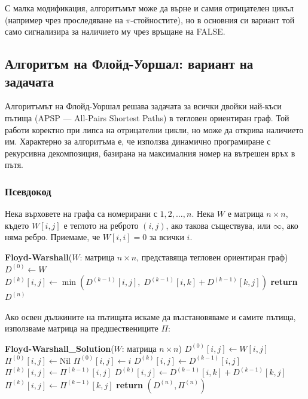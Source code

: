 \documentclass{article}
\renewcommand{\\}{\newline}
\begin{document}
С малка модификация, алгоритъмът може да върне и самия отрицателен цикъл (например чрез проследяване на \(\pi\)-стойностите), но в основния си вариант той само сигнализира за наличието му чрез връщане на FALSE.

\newpage
\subsection{Алгоритъм на Флойд-Уоршал: вариант на задачата}

Алгоритъмът на Флойд-Уоршал решава задачата за всички двойки най-къси пътища (APSP — All-Pairs Shortest Paths) в тегловен ориентиран граф. Той работи коректно при липса на отрицателни цикли, но може да открива наличието им. Характерно за алгоритъма е, че използва динамично програмиране с рекурсивна декомпозиция, базирана на максималния номер на вътрешен връх в пътя.

\subsubsection{Псевдокод}

Нека върховете на графа са номерирани с \(1, 2, \dots, n\). Нека \(W\) е матрица \(n \times n\), където \(W[i, j]\) е теглото на реброто \((i, j)\), ако такова съществува, или \(\infty\), ако няма ребро. Приемаме, че \(W[i, i] = 0\) за всички \(i\).

\begin{algorithmic}[1]
\State \textbf{Floyd-Warshall}(\(W\): матрица \(n \times n\), представяща тегловен ориентиран граф)
\State \(D^{(0)} \gets W\)
            \State \(D^{(k)}[i, j] \gets \min(D^{(k-1)}[i, j],\; D^{(k-1)}[i, k] + D^{(k-1)}[k, j])\)
        \EndFor
    \EndFor
\EndFor
\State \textbf{return} \(D^{(n)}\)
\end{algorithmic}

Ако освен дължините на пътищата искаме да възстановяваме и самите пътища, използваме матрица на предшествениците \(\Pi\):

\begin{algorithmic}[1]
\State \textbf{Floyd-Warshall\_Solution}(\(W\): матрица \(n \times n\))
        \State \(D^{(0)}[i, j] \gets W[i, j]\)
            \State \(\Pi^{(0)}[i, j] \gets \text{Nil}\)
        \Else
            \State \(\Pi^{(0)}[i, j] \gets i\)
        \EndIf
    \EndFor
\EndFor
{}
                \State \(D^{(k)}[i, j] \gets D^{(k-1)}[i, j]\)
                \State \(\Pi^{(k)}[i, j] \gets \Pi^{(k-1)}[i, j]\)
            \Else
                \State \(D^{(k)}[i, j] \gets D^{(k-1)}[i, k] + D^{(k-1)}[k, j]\)
                \State \(\Pi^{(k)}[i, j] \gets \Pi^{(k-1)}[k, j]\)
            \EndIf
        \EndFor
    \EndFor
\EndFor
\State \textbf{return} \((D^{(n)}, \Pi^{(n)})\)
\end{algorithmic}
\end{document}

